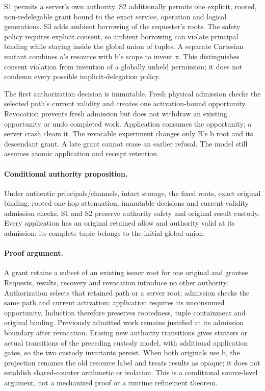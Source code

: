 \documentclass[11pt,a4paper]{article}
\theoremstyle{definition}
\theoremstyle{remark}
\begin{document}
S1 permits a server's own authority. S2 additionally permits one explicit, rooted, non-redelegable grant bound to the exact service, operation and logical generations. S3 adds ambient borrowing of the requester's roots. The safety policy requires explicit consent, so ambient borrowing can violate principal binding while staying inside the global union of tuples. A separate Cartesian mutant combines a's resource with b's scope to invent x. This distinguishes consent violation from invention of a globally unheld permission; it does not condemn every possible implicit-delegation policy.

The first authorization decision is immutable. Fresh physical admission checks the selected path's current validity and creates one activation-bound opportunity. Revocation prevents fresh admission but does not withdraw an existing opportunity or undo completed work. Application consumes the opportunity; a server crash clears it. The revocable experiment changes only B's b root and its descendant grant. A late grant cannot erase an earlier refusal. The model still assumes atomic application and receipt retention.

\paragraph{Conditional authority proposition.} Under authentic principals/channels, intact storage, the fixed roots, exact original binding, rooted one-hop attenuation, immutable decisions and current-validity admission checks, S1 and S2 preserve authority safety and original result custody. Every application has an original retained allow and authority valid at its admission; its complete tuple belongs to the initial global union.

\paragraph{Proof argument.} A grant retains a subset of an existing issuer root for one original and grantee. Requests, results, recovery and revocation introduce no other authority. Authorization selects that retained path or a server root; admission checks the same path and current activation; application requires its unconsumed opportunity. Induction therefore preserves rootedness, tuple containment and original binding. Previously admitted work remains justified at its admission boundary after revocation. Erasing new authority transitions gives stutters or actual transitions of the preceding custody model, with additional application gates, so the two custody invariants persist. When both originals use b, the projection renames the old resource label and treats results as opaque; it does not establish shared-counter arithmetic or isolation. This is a conditional source-level argument, not a mechanized proof or a runtime refinement theorem.
\end{document}
